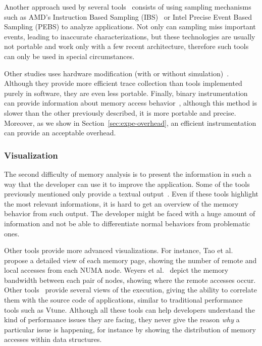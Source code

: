 Another approach used by several
tools~\cite{Lachaize12MemProf,McCurdy2010,Liu14Tool,Gimenez14Dissecting}
consists of using sampling mechanisms such as AMD's Instruction Based Sampling
(IBS)~\cite{Drongowski07Instructionbased} or Intel Precise Event Based
Sampling (PEBS) to analyze applications. Not only can sampling miss important events, leading to
inaccurate characterizations, but these technologies are usually not portable and work
only with a few recent architecture, therefore such tools can only be used in
special circumstances.

Other studies uses hardware modification (with or without simulation)~\cite{Bao08HMTT,Martonosi92MemSpy}.
Although they provide more efficient trace collection than tools implemented purely in software, they are even less portable.
Finally, binary instrumentation can provide information about memory access behavior~\cite{DeRose02SIGMA}, although this method is slower than
the other previously described, it is more portable and precise. Moreover, as
we show in Section~\ref{sec:expe-overhead}, an efficient instrumentation can
provide an acceptable overhead.

\subsubsection{Visualization}

The second difficulty of memory analysis is to present the information in such
a way that the developer can use it to improve the application. Some of the tools
previously mentioned only provide a textual
output~\cite{Lachaize12MemProf,McCurdy2010,Martonosi92MemSpy}. Even if these
tools highlight the most relevant informations, it is hard to get an overview
of the memory behavior from such output. The developer might be faced with a huge
amount of information and not be able to differentiate normal behaviors from
problematic ones.


Other tools provide more advanced visualizations. For
instance, Tao et al.~\cite{Tao01Visualizing} propose a detailed view of each memory
page, showing the number of remote and local accesses from each NUMA node. Weyers et
al.~\cite{Weyers14Visualization} depict the memory bandwidth between each pair of nodes,
showing where the remote accesses occur. Other
tools~\cite{DeRose01Hardware,DeRose02SIGMA,Bosch00Rivet} provide several views
of the execution, giving the ability to correlate them with the source code of applications, similar to traditional performance tools such as Vtune. Although
all these tools can help developers understand the kind of
performance issues they are facing, they never give the reason \emph{why} a particular
issue is happening, for instance by showing the distribution of memory accesses within data structures.

